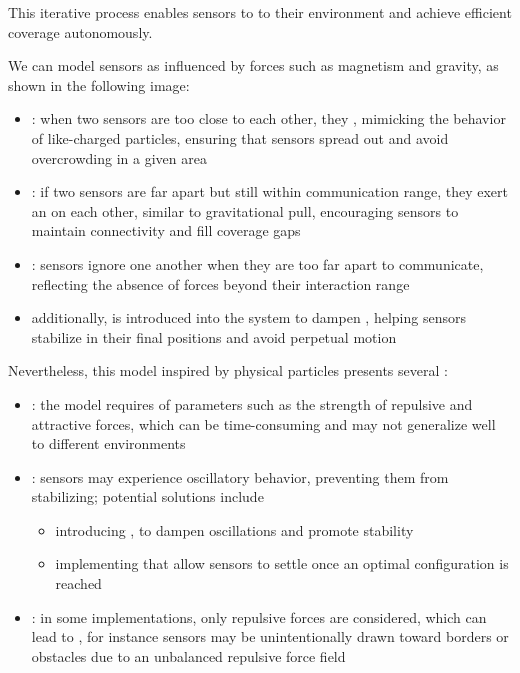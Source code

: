 \documentclass[a4paper, 12pt]{report}
\begin{document}
    This iterative process enables sensors to  to their environment and achieve efficient coverage autonomously.

    We can model sensors as  influenced by forces such as magnetism and gravity, as shown in the following image:


    \begin{itemize}
        \item {}: when two sensors are too close to each other, they , mimicking the behavior of like-charged particles, ensuring that sensors spread out and avoid overcrowding in a given area
        \item {}: if two sensors are far apart but still within communication range, they exert an  on each other, similar to gravitational pull, encouraging sensors to maintain connectivity and fill coverage gaps
        \item {}: sensors ignore one another when they are too far apart to communicate, reflecting the absence of forces beyond their interaction range
        \item additionally,  is introduced into the system to dampen , helping sensors stabilize in their final positions and avoid perpetual motion
    \end{itemize}

    Nevertheless, this model inspired by physical particles presents several :

    \begin{itemize}
        \item {}: the model requires  of parameters such as the strength of repulsive and attractive forces, which can be time-consuming and may not generalize well to different environments
    \item {}: sensors may experience oscillatory behavior, preventing them from stabilizing; potential solutions include
            \begin{itemize}
                \item introducing , to dampen oscillations and promote stability
                \item implementing  that allow sensors to settle once an optimal configuration is reached
            \end{itemize}
        \item {}: in some implementations, only repulsive forces are considered, which can lead to , for instance sensors may be unintentionally drawn toward borders or obstacles due to an unbalanced repulsive force field
    \end{itemize}
\end{document}
